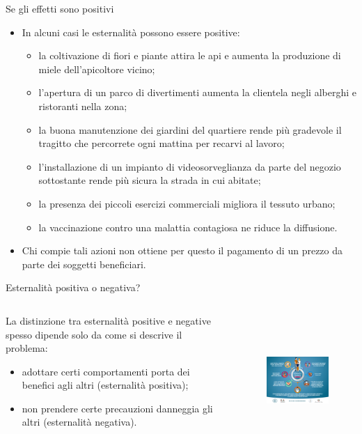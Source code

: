 \documentclass[aspectratio=64,12pt]{beamer}
\begin{document}
\begin{frame}{Se gli effetti sono positivi}
\begin{itemize}
\item In alcuni casi le esternalità possono essere positive:
\begin{itemize}
\item la coltivazione di fiori e piante attira le api e aumenta la produzione di
miele dell’apicoltore vicino;
\item l’apertura di un parco di divertimenti aumenta la clientela negli alberghi
e ristoranti nella zona;
\item la buona manutenzione dei giardini del quartiere rende più gradevole il
tragitto che percorrete ogni mattina per recarvi al lavoro;
\item l’installazione di un impianto di videosorveglianza da parte del negozio
sottostante rende più sicura la strada in cui abitate;
\item la presenza dei piccoli esercizi commerciali migliora il tessuto urbano;
\item la vaccinazione contro una malattia contagiosa ne riduce la diffusione.
\end{itemize}
\item Chi compie tali azioni non ottiene per questo il pagamento di un prezzo da
parte dei soggetti beneficiari.
\end{itemize}
\end{frame}

\begin{frame}{Esternalità positiva o negativa?}
\begin{columns}
\begin{column}{.4\columnwidth}
  La distinzione tra esternalità positive e negative spesso dipende solo da come si descrive il problema:
\begin{itemize}
\item adottare certi comportamenti porta dei benefici agli altri (esternalità positiva);
\item non prendere certe precauzioni danneggia gli altri (esternalità negativa).
\end{itemize}
\end{column}

\begin{column}{.6\columnwidth}
\begin{figure}[htbp]
\centering
\includegraphics[height=5cm]{./figure/locandina-corona.png}
\end{figure}
\end{column}
\end{columns}
\end{frame}
\end{document}
